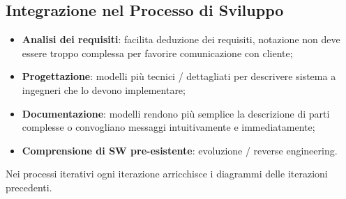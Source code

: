\documentclass{article}
\begin{document}
    \subsection{Integrazione nel Processo di Sviluppo}
      \begin{itemize}
        \item \textbf{Analisi dei requisiti}: facilita deduzione dei requisiti, notazione non deve essere troppo complessa per favorire comunicazione con cliente;
        \item \textbf{Progettazione}: modelli più tecnici / dettagliati per descrivere sistema a ingegneri che lo devono implementare;
        \item \textbf{Documentazione}: modelli rendono più semplice la descrizione di parti complesse o convogliano messaggi intuitivamente e immediatamente;
        \item \textbf{Comprensione di SW pre-esistente}: evoluzione / reverse engineering.
      \end{itemize}
      Nei processi iterativi ogni iterazione arricchisce i diagrammi delle iterazioni precedenti.
\end{document}
